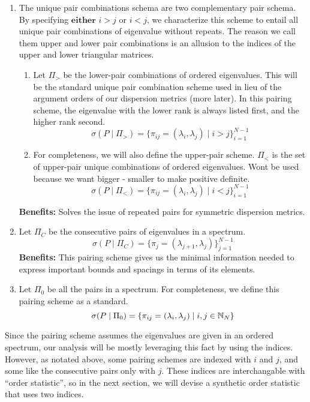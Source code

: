 \begin{enumerate}
  \item The unique pair combinations schema are two complementary pair schema. By specifying $\textbf{either}$ $i > j$ or $i < j$, we characterize this scheme to entail all unique pair combinations of eigenvalue without repeats. The reason we call them upper and lower pair combinations is an allusion to the indices of the upper and lower triangular matrices. \begin{enumerate}
    \item Let $\Pi_>$ be the lower-pair combinations of ordered eigenvalues. This will be the standard unique pair combination scheme used in lieu of the argument orders of our dispersion metrics (more later). In this pairing scheme, the eigenvalue with the lower rank is always listed first, and the higher rank second.
    $$\sigma(P \mid \Pi_>) = \{\pi_{ij} = (\lambda_i,\lambda_j) \mid i > j\}_{i = 1}^{N-1}$$
    \item For completeness, we will also define the upper-pair scheme. $\Pi_<$ is the set of upper-pair unique combinations of ordered eigenvalues. Wont be used because we want bigger - smaller to make positive definite.
    $$\sigma(P \mid \Pi_<) = \{\pi_{ij} = (\lambda_i,\lambda_j) \mid i < j\}_{i = 1}^{N-1}$$
  \end{enumerate} 
  \textbf{Benefits:} Solves the issue of repeated pairs for symmetric dispersion metrics.  
\item Let $\Pi_C$ be the consecutive pairs of eigenvalues in a spectrum. 
  $$\sigma(P \mid \Pi_C) = \{\pi_{j} = (\lambda_{j + 1},\lambda_j)\}_{j = 1}^{N-1}$$
  \textbf{Benefits:} This pairing scheme gives us the minimal information needed to express important bounds and spacings in terms of its elements. 
  \item Let $\Pi_0$ be all the pairs in a spectrum. For completeness, we define this pairing scheme as a standard.
  $$\sigma(P \mid \Pi_0) = \{\pi_{ij} = (\lambda_{i},\lambda_j) \mid i,j \in \mathbb{N}_N\}$$
\end{enumerate}

\begin{remark}
Since the pairing scheme assumes the eigenvalues are given in an ordered spectrum, our analysis will be mostly leveraging this fact by using the indices. However, as notated above, some pairing schemes are indexed with $i$ and $j$, and some like the consecutive pairs only with $j$. These indices are interchangable with ``order statistic'', so in the next section, we will devise a synthetic order statistic that uses two indices. 
\end{remark}

